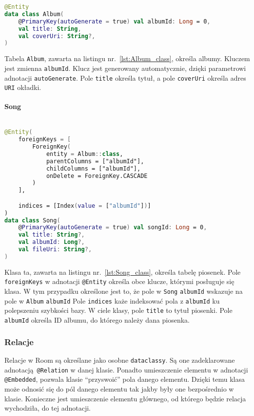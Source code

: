 \begin{lstlisting}[caption=Deklaracja tabeli Album, label={lst:Album_class}, language=kotlin]
@Entity
data class Album(
    @PrimaryKey(autoGenerate = true) val albumId: Long = 0,
    val title: String,
    val coverUri: String?,
)
\end{lstlisting}

Tabela \texttt{Album}, zawarta na listingu nr.~\ref{lst:Album_class}, określa albumy. Kluczem jest zmienna \texttt{albumId}. Klucz jest generowany automatycznie, dzięki parametrowi adnotacji \texttt{autoGenerate}. Pole \texttt{title} określa tytuł, a pole \texttt{coverUri} określa adres \texttt{URI} okładki.

\paragraph{Song}

\begin{lstlisting}[caption=Deklaracja tabeli Song, label={lst:Song_class}, language=kotlin]

@Entity(
    foreignKeys = [
        ForeignKey(
            entity = Album::class,
            parentColumns = ["albumId"],
            childColumns = ["albumId"],
            onDelete = ForeignKey.CASCADE
        )
    ],

    indices = [Index(value = ["albumId"])]
)
data class Song(
    @PrimaryKey(autoGenerate = true) val songId: Long = 0,
    val title: String?,
    val albumId: Long?,
    val fileUri: String?,
)

\end{lstlisting}

Klasa ta, zawarta na listingu nr.~\ref{lst:Song_class}, określa tabelę piosenek. Pole \texttt{foreignKeys} w adnotacji \texttt{@Entity} określa obce klucze, którymi posługuje się klasa. W tym przypadku określone jest to, że pole w \texttt{Song} \texttt{albumId} wskazuje na pole w \texttt{Album} \texttt{albumId} Pole \texttt{indices} każe indeksować pola z \texttt{albumId} ku polepszeniu szybkości bazy. W ciele klasy, pole \texttt{title} to tytuł piosenki. Pole \texttt{albumId} określa ID albumu, do którego należy dana piosenka. 

\subsubsection{Relacje} \label{sec:relations}

Relacje w Room są określane jako osobne \texttt{dataclassy}. Są one zadeklarowane adnotacją \texttt{@Relation} w danej klasie. Ponadto umieszczenie elementu w adnotacji \texttt{@Embedded}, pozwala klasie \enquote{przyswoić} pola danego elementu. Dzięki temu klasa może odnosić się do pól danego elementu tak jakby były one bezpośrednio w klasie. Konieczne jest umieszczenie elementu głównego, od którego będzie relacja wychodziła, do tej adnotacji.

